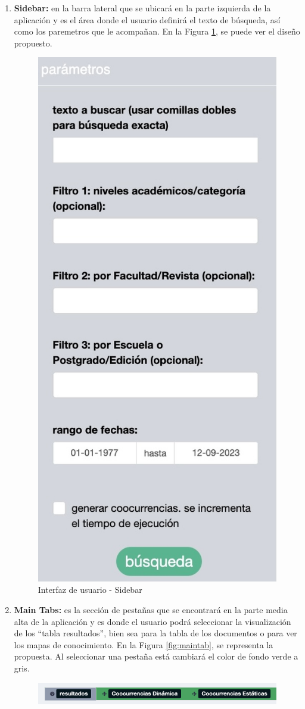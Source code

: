 \documentclass[
  12pt,
  openany]{book}
\begin{document}
\begin{enumerate}
\def\labelenumi{\arabic{enumi}.}
\item
  \textbf{Sidebar:} en la barra lateral que se ubicará en la parte izquierda de la aplicación y es el área donde el usuario definirá el texto de búsqueda, así como los paremetros que le acompañan. En la Figura \ref{fig:sidebar2}, se puede ver el diseño propuesto.

  \begin{figure}

  {\centering \includegraphics[width=0.35\linewidth]{images/05-desarrollo/4_ciclo/UI/sidebar} 

  }

  \caption{Interfaz de usuario - Sidebar}\label{fig:sidebar2}
  \end{figure}
\item
  \textbf{Main Tabs:} es la sección de pestañas que se encontrará en la parte media alta de la aplicación y es donde el usuario podrá seleccionar la visualización de los ``tabla resultados'', bien sea para la tabla de los documentos o para ver los mapas de conocimiento. En la Figura \ref{fig:maintab}, se representa la propuesta. Al seleccionar una pestaña está cambiará el color de fondo verde a gris.

  \begin{figure}

  {\centering \includegraphics[width=0.9\linewidth]{images/05-desarrollo/4_ciclo/UI/maintab} 

}
\end{figure}
\end{enumerate}
\end{document}
